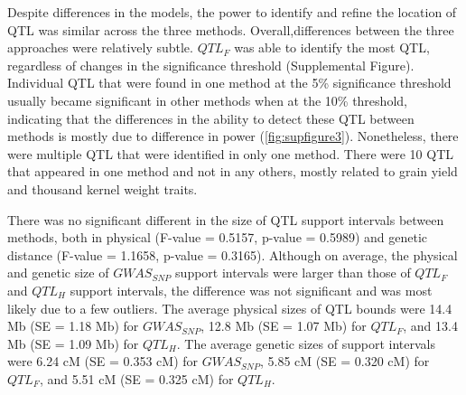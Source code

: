 \documentclass[article,9pt,twocolumn,twoside]{rilabRxiv}
\begin{document}
Despite differences in the models, the power to identify and refine the location of QTL was similar across the three methods.
Overall,differences between the three approaches were relatively subtle.
$QTL_F$ was able to identify the most QTL, regardless of changes in the significance threshold (Supplemental Figure).
Individual QTL that were found in one method at the 5\% significance threshold usually became significant in other methods when at the 10\% threshold, indicating that the differences in the ability to detect these QTL between methods is mostly due to difference in power (\ref{fig:supfigure3}).
Nonetheless, there were multiple QTL that were identified in only one method. There were 10 QTL that appeared in one method and not in any others, mostly related to grain yield and thousand kernel weight traits.

There was no significant different in the size of QTL support intervals between methods, both in physical (F-value = 0.5157, p-value = 0.5989) and genetic distance (F-value = 1.1658, p-value = 0.3165).
Although on average, the physical and genetic size of $GWAS_{SNP}$ support intervals were larger than those of $QTL_F$ and $QTL_H$ support intervals, the difference was not significant and was most likely due to a few outliers.
The average physical sizes of QTL bounds were 14.4 Mb (SE = 1.18 Mb) for $GWAS_{SNP}$, 12.8 Mb (SE = 1.07 Mb) for $QTL_F$, and 13.4 Mb (SE = 1.09 Mb) for $QTL_H$.
The average genetic sizes of support intervals were 6.24 cM (SE = 0.353 cM) for $GWAS_{SNP}$, 5.85 cM (SE = 0.320 cM) for $QTL_F$, and 5.51 cM (SE = 0.325 cM) for $QTL_H$.
\end{document}
